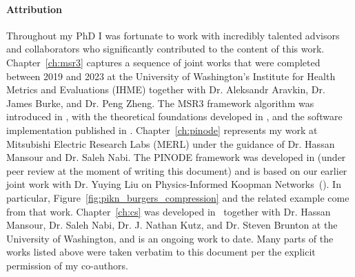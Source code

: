 \paragraph{Attribution} Throughout my PhD I was fortunate to work with incredibly talented advisors and collaborators who significantly contributed to the content of this work. Chapter~\ref{ch:msr3} captures a sequence of joint works that were completed between 2019 and 2023 at the University of Washington's Institute for Health Metrics and Evaluations (IHME) together with Dr. Aleksandr Aravkin, Dr. James Burke, and Dr. Peng Zheng. The MSR3 framework algorithm was introduced in \cite{sholokhov2022relaxation}, with the theoretical foundations developed in \cite{aravkin2022jimtheory}, and the software implementation published in \cite{sholokhov2023pysr3}. Chapter~\ref{ch:pinode} represents my work at Mitsubishi Electric Research Labs (MERL) under the guidance of Dr. Hassan Mansour and Dr. Saleh Nabi. The PINODE framework was developed in \cite{sholokhov2023pinode} (under peer review at the moment of writing this document) and is based on our earlier joint work with Dr. Yuying Liu on Physics-Informed Koopman Networks~(\cite{liu2022physics}). In particular, Figure~\ref{fig:pikn_burgers_compression} and the related example come from that work. Chapter~\ref{ch:cs} was developed in~\cite{sholokhov2023cs} together with Dr. Hassan Mansour, Dr. Saleh Nabi, Dr. J. Nathan Kutz, and Dr. Steven Brunton at the University of Washington, and is an ongoing work to date. Many parts of the works listed above were taken verbatim to this document per the explicit permission of my co-authors.